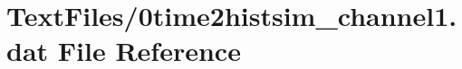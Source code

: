 \hypertarget{0time2histsim__channel1_8dat}{}\section{Text\+Files/0time2histsim\+\_\+channel1.dat File Reference}
\label{0time2histsim__channel1_8dat}
